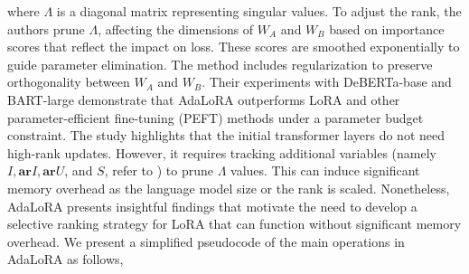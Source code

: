  where $\Lambda$ is a diagonal matrix representing singular values. To adjust the rank, the authors prune $\Lambda$, affecting the dimensions of $W_A$ and $W_B$ based on importance scores that reflect the impact on loss. These scores are smoothed exponentially to guide parameter elimination. The method includes regularization to preserve orthogonality between $W_A$ and $W_B$. Their experiments with DeBERTa-base and BART-large demonstrate that AdaLoRA outperforms LoRA and other parameter-efficient fine-tuning (PEFT) methods under a parameter budget constraint. The study highlights that the initial transformer layers do not need high-rank updates. However, it requires tracking additional variables (namely $I, \mathbf{ar}{I}, \mathbf{ar}{U}$, and $S$, refer to \citep{zhang2023adaptive}) to prune $\Lambda$ values. This can induce significant memory overhead as the language model size or the rank is scaled. Nonetheless, AdaLoRA presents insightful findings that motivate the need to develop a selective ranking strategy for LoRA that can function without significant memory overhead. We present a simplified pseudocode of the main operations in AdaLoRA as follows,


